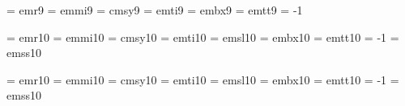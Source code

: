  \font\ninrm  = emr9		%
 \font\ninmi  = emmi9		%
    \skewchar{}	%
 \font\ninsy  = cmsy9		%
    \skewchar{}		%
 \font\ninit  = emti9		%
 \font\ninbf  = embx9		%
 \font\nintt  = emtt9		%
    \hyphenchar\nintt = -1	%

 \font\tenrm  = emr10		%
 \font\tenmi  = emmi10		%
    \skewchar{}	%
 \font\tensy  = cmsy10		%
    \skewchar{}		%
 \font\tenit  = emti10		%
 \font\tensl  = emsl10		%
 \font\tenbf  = embx10		%
 \font\tentt  = emtt10		%
    \hyphenchar\tentt = -1	%
 \font\tensf  = emss10		%

 \font\elvrm  = emr10	\@halfmag	%
 \font\elvmi  = emmi10	\@halfmag	%
    \skewchar{}	%
 \font\elvsy  = cmsy10	\@halfmag	%
    \skewchar{}		%
 \font\elvit  = emti10	\@halfmag	%
 \font\elvsl  = emsl10	\@halfmag	%
 \font\elvbf  = embx10	\@halfmag	%
 \font\elvtt  = emtt10	\@halfmag	%
    \hyphenchar\elvtt = -1	%
 \font\elvsf  = emss10	\@halfmag	%

